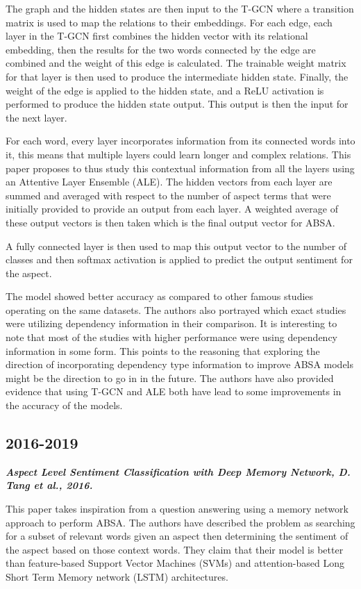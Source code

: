 \documentclass[conference]{IEEEtran}
\begin{document}
The graph and the hidden states are then input to the T-GCN where a transition matrix is used to map the relations to their embeddings. For each edge, each layer in the T-GCN first combines the hidden vector with its relational embedding, then the results for the two words connected by the edge are combined and the weight of this edge is calculated. The trainable weight matrix for that layer is then used to produce the intermediate hidden state. Finally, the weight of the edge is applied to the hidden state, and a ReLU activation is performed to produce the hidden state output. This output is then the input for the next layer.

For each word, every layer incorporates information from its connected words into it, this means that multiple layers could learn longer and complex relations. This paper proposes to thus study this contextual information from all the layers using an Attentive Layer Ensemble (ALE). The hidden vectors from each layer are summed and averaged with respect to the number of aspect terms that were initially provided to provide an output from each layer. A weighted average of these output vectors is then taken which is the final output vector for ABSA.

A fully connected layer is then used to map this output vector to the number of classes and then softmax activation is applied to predict the output sentiment for the aspect.

The model showed better accuracy as compared to other famous studies operating on the same datasets. The authors also portrayed which exact studies were utilizing dependency information in their comparison. It is interesting to note that most of the studies with higher performance were using dependency information in some form. This points to the reasoning that exploring the direction of incorporating dependency type information to improve ABSA models might be the direction to go in in the future. The authors have also provided evidence that using T-GCN and ALE both have lead to some improvements in the accuracy of the models.\\

\subsection{2016-2019}

\textit{\textbf{Aspect Level Sentiment Classification with Deep Memory Network, D. Tang et al., 2016.}}

This paper takes inspiration from a question answering using a memory network approach to perform ABSA. The authors have described the problem as searching for a subset of relevant words given an aspect then determining the sentiment of the aspect based on those context words. They claim that their model is better than feature-based Support Vector Machines (SVMs) and attention-based Long Short Term Memory network (LSTM) architectures.
\end{document}
